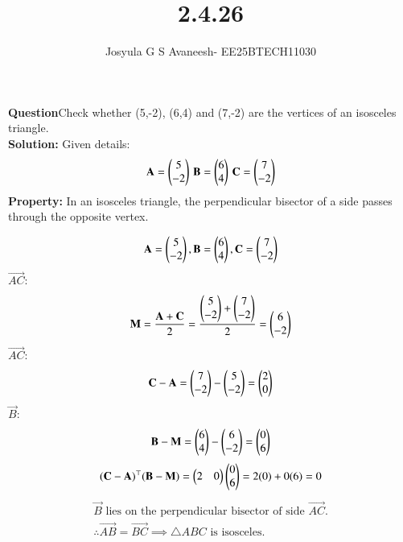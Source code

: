 \documentclass[journal]{IEEEtran}
\theoremstyle{remark}
\begin{document}

\onecolumn

\title{2.4.26}
\author{Josyula G S Avaneesh- EE25BTECH11030}
\maketitle


\renewcommand{\thefigure}{\theenumi}
\renewcommand{\thetable}{\theenumi}
\textbf{Question}Check whether (5,-2), (6,4) and (7,-2) are the vertices of an isosceles triangle.\\
\textbf{Solution: }Given details:
\begin{align}
    \mathbf{A}=\begin{pmatrix}5 \\ -2\end{pmatrix}\, \mathbf{B}=\begin{pmatrix}6 \\ 4\end{pmatrix}\, \mathbf{C}=\begin{pmatrix}7\\-2\end{pmatrix}
\end{align}
\textbf{Property:} In an isosceles triangle, the perpendicular bisector of a side passes through the opposite vertex.

\begin{align}
\mathbf{A}=\begin{pmatrix}5 \\ -2\end{pmatrix}, \mathbf{B}=\begin{pmatrix}6 \\ 4\end{pmatrix}, \mathbf{C}=\begin{pmatrix}7\\-2\end{pmatrix}
\end{align}
 $\vec{AC}$: 
\begin{align}
 \mathbf{M} = \frac{\mathbf{A}+\mathbf{C}}{2} 
= \frac{\begin{pmatrix}5\\-2\end{pmatrix}+\begin{pmatrix}7\\-2\end{pmatrix}}{2} 
= \begin{pmatrix}6\\-2\end{pmatrix}
\end{align}
 $\vec{AC}$: 
\begin{align}
 \mathbf{C}-\mathbf{A} = \begin{pmatrix}7\\-2\end{pmatrix}-\begin{pmatrix}5\\-2\end{pmatrix} 
= \begin{pmatrix}2\\0\end{pmatrix}
\end{align}
 $\vec{B}$:
\begin{align}
\mathbf{B}-\mathbf{M} = \begin{pmatrix}6\\4\end{pmatrix}-\begin{pmatrix}6\\-2\end{pmatrix} 
= \begin{pmatrix}0\\6\end{pmatrix}
\end{align}
\begin{align}
(\mathbf{C}-\mathbf{A})^\top(\mathbf{B}-\mathbf{M}) 
= \begin{pmatrix}2&0\end{pmatrix}\begin{pmatrix}0\\6\end{pmatrix} = 2(0)+0(6)=0
\end{align}
\begin{align*}
 \vec{B} \text{ lies on the perpendicular bisector of side } \vec{AC}.\\
 \therefore \vec{AB} = \vec{BC} \implies \triangle ABC \text{ is isosceles.}
\end{align*}
\end{document}
